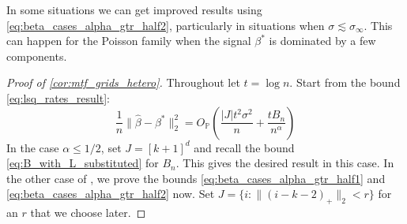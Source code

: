 \documentclass[ejs,noshowframe]{imsart}
\theoremstyle{plain}
\theoremstyle{definition}
\renewcommand{\P}{\mathbb{P}}
\newcommand{\snorm}[1]{\lVert #1 \rVert}
\renewcommand{\hat}{\widehat}
\begin{document}
\begin{appendix}
In some situations we can get improved results using \eqref{eq:beta_cases_alpha_gtr_half2}, particularly in situations when $\sigma \lesssim \sigma_\infty$.
This can happen for the Poisson family when the signal $\beta^*$ is dominated by
a few components. 


\begin{proof}[Proof of \autoref{cor:mtf_grids_hetero}]
	
	
	Throughout let $t = \log n$.
	Start from the bound \eqref{eq:lsq_rates_result}:
	\begin{equation}
		\frac{1}{n}\snorm{ \hat\beta - \beta^* }_2^2 
		= O_\P \left( \frac{|J| t^2 \sigma^2 }{n} + \frac{t B_n}{n^\alpha}\right)
	\end{equation}
	 In the case $\alpha \leq 
	1/2$, set $J=[k+1]^d$ and recall the bound \eqref{eq:B_with_L_substituted} 
	for $B_n$. This gives the desired result in this case. 	In the other case of 
	, we prove the bounds 
	\eqref{eq:beta_cases_alpha_gtr_half1} and 
	\eqref{eq:beta_cases_alpha_gtr_half2} 
	now. Set $J = \{ i : \| (i-k-2)_+\|_2 < r\}$ for an $r$ that we choose later.
	
	
	

\end{proof}
\end{appendix}
\end{document}

